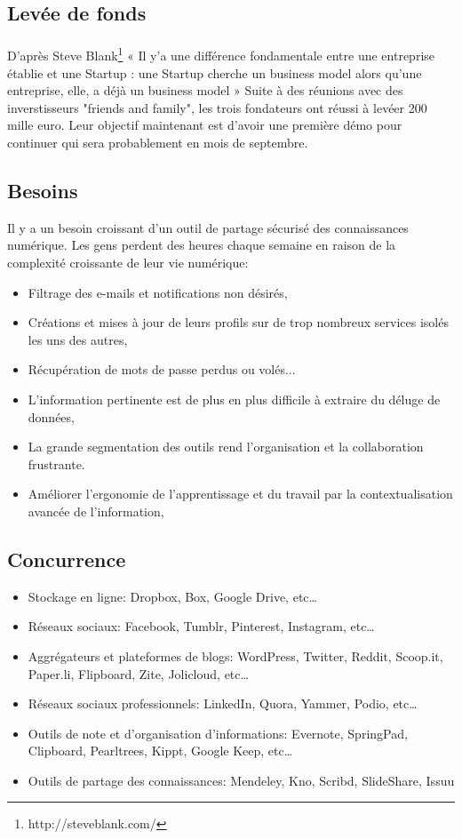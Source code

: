 \subsection{Levée de fonds}
\paragraph{}
D'après Steve Blank\footnote{http://steveblank.com/} « Il y'a une différence fondamentale entre une entreprise établie et 
une Startup : une Startup cherche un business model alors qu’une entreprise, elle, a déjà un 
business model »\newline
Suite à des réunions avec des inverstisseurs "friends and family", les trois fondateurs ont réussi à levéer 200 mille euro.
Leur objectif maintenant est d'avoir une première démo pour continuer qui sera probablement en mois de septembre.
\subsection{Besoins}
Il y a un besoin croissant d'un outil de partage sécurisé des connaissances numérique. Les gens perdent des heures chaque semaine en raison de la complexité croissante de leur vie numérique:
\begin{itemize}
\item Filtrage des e-mails et notifications non désirés,
\item Créations et mises à jour de leurs profils sur de trop nombreux services isolés les uns des autres,
\item Récupération de mots de passe perdus ou volés...
\item L'information pertinente est de plus en plus difficile à extraire du déluge de données,
\item La grande segmentation des outils rend l'organisation et la collaboration frustrante.
\item Améliorer l'ergonomie de l'apprentissage et du travail par la contextualisation avancée de l'information,

\end{itemize}
\subsection{Concurrence}
\begin{itemize}
\item Stockage en ligne: Dropbox, Box, Google Drive, etc…
\item Réseaux sociaux: Facebook, Tumblr, Pinterest, Instagram, etc…
\item Aggrégateurs et plateformes de blogs: WordPress, Twitter, Reddit, Scoop.it, Paper.li, Flipboard, Zite, Jolicloud, etc…
\item Réseaux sociaux professionnels: LinkedIn, Quora, Yammer, Podio, etc…
\item Outils de note et d'organisation d'informations: Evernote, SpringPad, Clipboard, Pearltrees, Kippt, Google Keep, etc…
\item Outils de partage des connaissances: Mendeley, Kno, Scribd, SlideShare, Issuu

\end{itemize}
